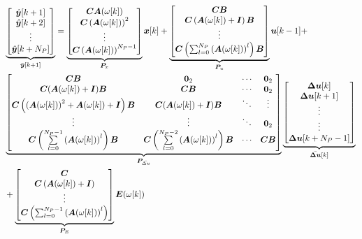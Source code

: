 \begin{align}
\begin{split}
	&
\underbrace{
	\begin{bmatrix}
		\hat{\bm{y}}[k+1] \\
		\hat{\bm{y}}[k+2] \\
		\vdots \\
		\hat{\bm{y}}[k+N_P] \\
	\end{bmatrix}
}_{\Bar{\bm{y}}[k+1]} =
\underbrace{
	\begin{bmatrix}
	\bm{C} \bm{A}(\omega[k])  \\
	\bm{C}  \left(\bm{A}(\omega[k]) \right)^2 \\
	\vdots \\
	\bm{C} \left(\bm{A}(\omega[k]) \right)^{N_P-1} \\
	\end{bmatrix}
}_{\bm{P}_x}
{\bm{x}}[k] +
\underbrace{
	\begin{bmatrix}
		\bm{C} \bm{B} \\
		\bm{C}\left(\bm{A}(\omega[k]) + \bm{I} \right) \bm{B} \\
		\vdots \\
		\bm{C} \left( \sum_{l=0}^{N_P} \left(\bm{A}(\omega[k]) \right)^l \right) \bm{B} 
	\end{bmatrix}
}_{\bm{P}_u}
\bm{u}[k-1] + \\
&
\underbrace{
	\begin{bmatrix}
		\bm{CB} & \bm0_2 & \cdots & \bm0_2\\
		\bm{C}(\bm{A}(\omega[k])+\bm{I})\bm{B} & \bm{CB} & \cdots & \bm0_2\\
		\bm{C}\left(\left(\bm{A}(\omega[k])\right)^2+\bm{A}(\omega[k])+\bm{I}\right)\bm{B} & \bm{C}(\bm{A}(\omega[k])+\bm{I})\bm{B}  & \ddots & \vdots\\
		\vdots & \vdots & \ddots & \bm0_2\\
		\bm{C}\left(\sum\limits_{l=0}^{N_P-1}\left(\bm{A}(\omega[k])\right)^l\right)\bm{B}
		&
		\bm{C}\left(\sum\limits_{l=0}^{N_P-2}\left(\bm{A}(\omega[k])\right)^l\right)\bm{B}
		&
		\cdots
		&
		\bm{CB}
	\end{bmatrix}
}_{\bm{P}_{\Bar{\Delta u}}} 
\underbrace{
	\begin{bmatrix}
		{ \boldsymbol{\Delta u}}[k] \\
		{ \boldsymbol{\Delta u}}[k+1]\\
		\vdots \\
		\vdots \\
		{ \boldsymbol{\Delta u}}[k+N_P-1]
	\end{bmatrix}
}_{\Bar{\bm{\Delta u}}[k]} \\
&+ 
\underbrace{
	\begin{bmatrix}
		\bm{C} \\
		\bm{C}\left(\bm{A}(\omega[k]) + \bm{I} \right) \\
		\vdots \\
		\bm{C} \left( \sum_{l=0}^{N_P-1} \left(\bm{A}(\omega[k]) \right)^l \right) 
	\end{bmatrix}
}_{\bm{P}_E}
\bm{E}(\omega[k])
\end{split}
\end{align}

